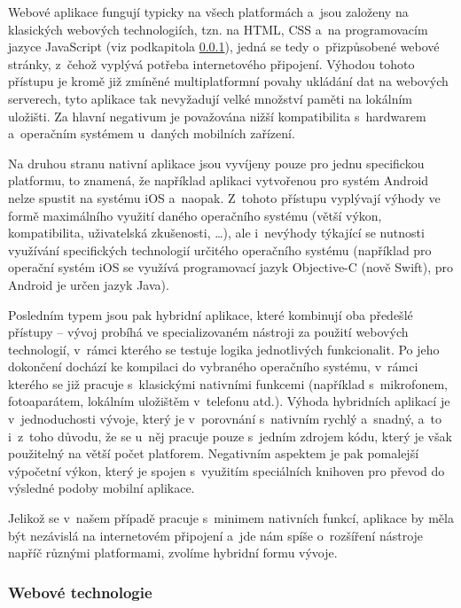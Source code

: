 Webové aplikace fungují typicky na všech platformách a~jsou založeny na
klasických webových technologiích, tzn. na HTML, CSS a~na programovacím
jazyce JavaScript (viz podkapitola \ref{webovuxe9-technologie}), jedná
se tedy o~přizpůsobené webové stránky, z~čehož vyplývá potřeba
internetového připojení. Výhodou tohoto přístupu je kromě již zmíněné
multiplatformní povahy ukládání dat na webových serverech, tyto aplikace
tak nevyžadují velké množství paměti na lokálním uložišti. Za hlavní
negativum je považována nižší kompatibilita s~hardwarem a~operačním
systémem u~daných mobilních zařízení.

Na druhou stranu nativní aplikace jsou vyvíjeny pouze pro jednu
specifickou platformu, to znamená, že například aplikaci vytvořenou pro
systém Android nelze spustit na systému iOS a~naopak. Z~tohoto přístupu
vyplývají výhody ve formě maximálního využití daného operačního systému
(větší výkon, kompatibilita, uživatelská zkušenosti, \ldots{}), ale
i~nevýhody týkající se nutnosti využívání specifických technologií
určitého operačního systému (například pro operační systém iOS se
využívá programovací jazyk Objective-C (nově Swift), pro Android je
určen jazyk Java).

Posledním typem jsou pak hybridní aplikace, které kombinují oba předešlé
přístupy -- vývoj probíhá ve specializovaném nástroji za použití
webových technologií, v~rámci kterého se testuje logika jednotlivých
funkcionalit. Po jeho dokončení dochází ke kompilaci do vybraného
operačního systému, v~rámci kterého se již pracuje s~klasickými
nativními funkcemi (například s~mikrofonem, fotoaparátem, lokálním
uložištěm v~telefonu atd.). Výhoda hybridních aplikací je
v~jednoduchosti vývoje, který je v~porovnání s~nativním rychlý a~snadný,
a~to i~z~toho důvodu, že se u~něj pracuje pouze s~jedním zdrojem kódu,
který je však použitelný na větší počet platforem. Negativním aspektem
je pak pomalejší výpočetní výkon, který je spojen s~využitím speciálních
knihoven pro převod do výsledné podoby mobilní aplikace.

Jelikož se v~našem případě pracuje s~minimem nativních funkcí, aplikace
by měla být nezávislá na internetovém připojení a~jde nám spíše
o~rozšíření nástroje napříč různými platformami, zvolíme hybridní formu
vývoje.

\hypertarget{webovuxe9-technologie}{%
\subsubsection{Webové technologie}\label{webovuxe9-technologie}}

